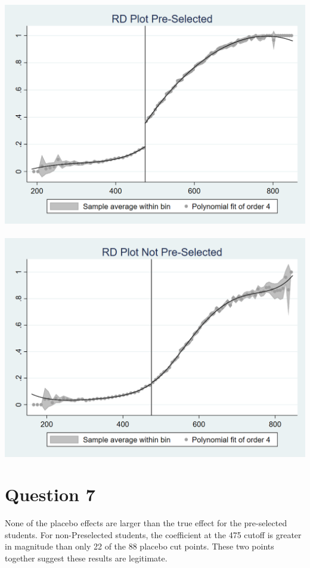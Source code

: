 \documentclass[11pt]{article}
\begin{document}
 	\includegraphics[width=1\linewidth]{rdplot_1.png} \\~\\
 	\includegraphics[width=1\linewidth]{rdplot_2.png}



\section{ Question 7}

None of the placebo effects are larger than the true effect for the pre-selected students. For non-Preselected students, the coefficient at the 475 cutoff is greater in magnitude than only 22 of the 88 placebo cut points. These two points together suggest these results are legitimate. \\~\\
\end{document}
